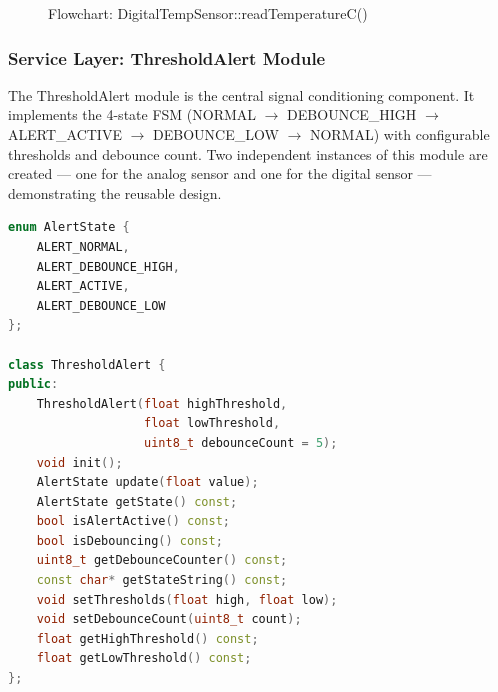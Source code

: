 \begin{figure}[H]
\centering
{}
\caption{Flowchart: DigitalTempSensor::readTemperatureC()}
\label{fig:flowchart_read_temp_digital}
\end{figure}

\subsubsection{Service Layer: ThresholdAlert Module}

The ThresholdAlert module is the central signal conditioning component. It implements the 4-state FSM (NORMAL $\rightarrow$ DEBOUNCE\_HIGH $\rightarrow$ ALERT\_ACTIVE $\rightarrow$ DEBOUNCE\_LOW $\rightarrow$ NORMAL) with configurable thresholds and debounce count. Two independent instances of this module are created --- one for the analog sensor and one for the digital sensor --- demonstrating the reusable design.

\begin{lstlisting}[language=C++, caption=ThresholdAlert interface (ThresholdAlert.h), label=lst:threshold_alert_h]
enum AlertState {
    ALERT_NORMAL,
    ALERT_DEBOUNCE_HIGH,
    ALERT_ACTIVE,
    ALERT_DEBOUNCE_LOW
};

class ThresholdAlert {
public:
    ThresholdAlert(float highThreshold,
                   float lowThreshold,
                   uint8_t debounceCount = 5);
    void init();
    AlertState update(float value);
    AlertState getState() const;
    bool isAlertActive() const;
    bool isDebouncing() const;
    uint8_t getDebounceCounter() const;
    const char* getStateString() const;
    void setThresholds(float high, float low);
    void setDebounceCount(uint8_t count);
    float getHighThreshold() const;
    float getLowThreshold() const;
};
\end{lstlisting}


